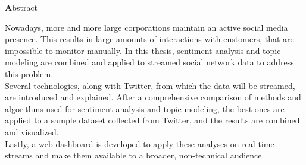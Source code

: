 
\clearemptydoublepage
{}
{}

\vspace*{2cm}
\begin{center}
{\Large \textbf Abstract}
\end{center}
\vspace{1cm}

Nowadays, more and more large corporations maintain an active social media presence.
This results in large amounts of interactions with customers, that are impossible to monitor manually.
In this thesis, sentiment analysis and topic modeling are combined and applied to streamed social network data to address this problem.
\\
Several technologies, along with Twitter, from which the data will be streamed, are introduced and explained.
After a comprehensive comparison of methods and algorithms used for sentiment analysis and topic modeling,
the best ones are applied to a sample dataset collected from Twitter,
and the results are combined and visualized.
\\
Lastly, a web-dashboard is developed to apply these analyses on real-time streams
and make them available to a broader, non-technical audience.


